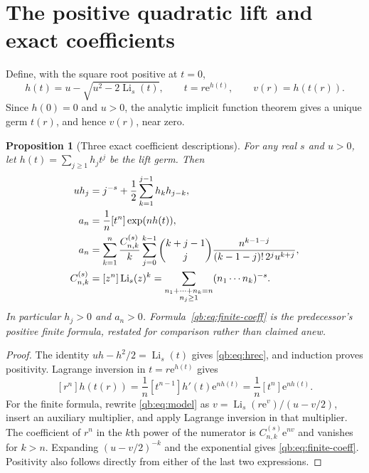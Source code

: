 \documentclass[11pt,a4paper]{article}
\newtheorem{proposition}[theorem]{Proposition}
\theoremstyle{definition}\newtheorem{definition}[theorem]{Definition}
\theoremstyle{remark}\newtheorem{remark}[theorem]{Remark}
\newcommand{\Li}{\operatorname{Li}}
\newcommand{\ee}{\mathrm e}
\numberwithin{equation}{section}
\begin{document}
\section{The positive quadratic lift and exact coefficients}\label{qb:sec:lift}

Define, with the square root positive at $t=0$,
\begin{equation}\label{qb:eq:lift}
 h(t)=u-\sqrt{u^2-2\Li_s(t)},\qquad t=r\ee^{h(t)},\qquad v(r)=h(t(r)).
\end{equation}
Since $h(0)=0$ and $u>0$, the
analytic implicit function theorem gives a unique germ $t(r)$, and hence
$v(r)$, near zero.

\begin{proposition}[Three exact coefficient descriptions]\label{qb:prop:coeff}
For any real $s$ and $u>0$, let $h(t)=\sum_{j\ge1}h_jt^j$ be the lift germ.
Then
\begin{align}
 u h_j&=j^{-s}+\frac12\sum_{k=1}^{j-1}h_kh_{j-k},\label{qb:eq:hrec}\\
 a_n&=\frac1n[t^n]\exp(nh(t)),\label{qb:eq:lagrange}\\
 a_n&=\sum_{k=1}^n\frac{C^{(s)}_{n,k}}{k}
 \sum_{j=0}^{k-1}\binom{k+j-1}{j}
 \frac{n^{k-1-j}}{(k-1-j)!\,2^j u^{k+j}},\label{qb:eq:finite-coeff}\\
 C^{(s)}_{n,k}&=[z^n]\Li_s(z)^k
 =\sum_{\substack{n_1+\cdots+n_k=n\\n_j\ge1}}
 (n_1\cdots n_k)^{-s}.\notag
\end{align}
In particular $h_j>0$ and $a_n>0$. Formula~\eqref{qb:eq:finite-coeff} is the
predecessor's positive finite formula, restated for comparison rather than
claimed anew.
\end{proposition}
\begin{proof}
The identity $uh-h^2/2=\Li_s(t)$ gives \eqref{qb:eq:hrec}, and induction
proves positivity. Lagrange inversion in $t=r\ee^{h(t)}$ gives
\[
 [r^n]h(t(r))=\frac1n[t^{n-1}]h'(t)\ee^{nh(t)}
             =\frac1n[t^n]\ee^{nh(t)}.
\]
For the finite formula, rewrite \eqref{qb:eq:model} as
$v=\Li_s(r\ee^v)/(u-v/2)$, insert an auxiliary multiplier, and apply
Lagrange inversion in that multiplier. The coefficient of $r^n$ in the
$k$th power of the numerator is $C^{(s)}_{n,k}\ee^{nv}$ and vanishes for
$k>n$. Expanding $(u-v/2)^{-k}$ and the exponential gives
\eqref{qb:eq:finite-coeff}. Positivity also follows directly from either
of the last two expressions.
\end{proof}
\end{document}

